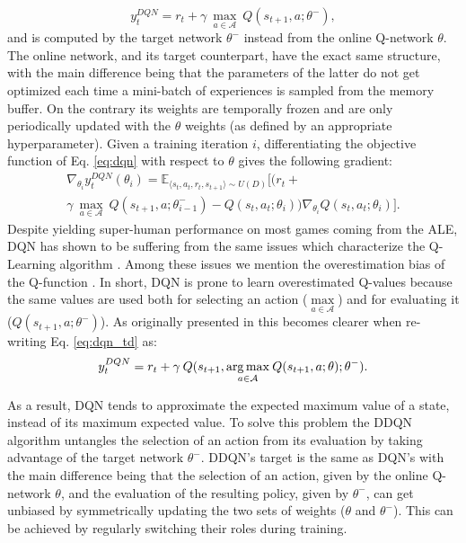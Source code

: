 \begin{equation}
    y^{DQN}_{t} = r_{t} + \gamma \: \underset{a\in \mathcal{A}}{\max}\: Q(s_{t+1}, a; \theta^{-}), 
\label{eq:dqn_td}
\end{equation}{}
and is computed by the target network $\theta^{-}$ instead from the online Q-network $\theta$. 
The online network, and its target counterpart, have the exact same structure, with the main difference being that the parameters of the latter do not get optimized each time a mini-batch of experiences is sampled from the memory buffer. On the contrary its weights are temporally frozen and are only periodically updated with the $\theta$ weights (as defined by an appropriate hyperparameter). Given a training iteration $i$, differentiating the objective function of Eq. \ref{eq:dqn} with respect to $\theta$ gives the following gradient: 
\begin{multline}
\nabla_{\theta_{i}}y^{DQN}_{t}(\theta_{i}) = \mathds{E}_{\langle s_{t},a_{t},r_{t},s_{t+1}\rangle\sim U(D)} \bigg[\big(r_{t} + \\ \gamma \: \underset{a\in \mathcal{A}}{\max}\: Q(s_{t+1}, a; \theta^{-}_{i-1})  - Q(s_{t}, a_{t}; \theta_{i})\big)\nabla_{\theta_{i}} Q(s_{t}, a_{t}; \theta_{i})\bigg].
\label{eq:dqn_gradient}
\end{multline}
Despite yielding super-human performance on most games coming from the ALE, DQN has shown to be suffering from the same issues which characterize the Q-Learning algorithm \cite{hasselt2010double}. Among these issues we mention the overestimation bias of the Q-function \cite{hasselt2010double}.
In short, DQN is prone to learn overestimated Q-values because the same values are used both for selecting an action ($\underset{a\in \mathcal{A}}{\max}$) and for evaluating it ($Q(s_{t+1},a;\theta^{-})$). As originally presented in \cite{van2016deep} this becomes clearer when re-writing Eq. \ref{eq:dqn_td} as:
\begin{equation}
    y^{DQN}_{t} = r_{t} + \gamma \: Q(s_{t+1}, \underset{a\in \mathcal{A}}{\operatorname*{arg\,max}}\: Q(s_{t+1}, a; \theta); \theta^{-}). 
\end{equation}{}

As a result, DQN tends to approximate the expected maximum value of a state, instead of its maximum expected value. To solve this problem the DDQN algorithm untangles the selection of an action from its evaluation by taking advantage of the target network $\theta^{-}$. DDQN's target is the same as DQN's with the main difference being that the selection of an action, given by the online Q-network $\theta$, and the evaluation of the resulting policy, given by $\theta^{-}$, can get unbiased by symmetrically updating the two sets of weights ($\theta$ and $\theta^{-}$). This can be achieved by regularly switching their roles during training.

